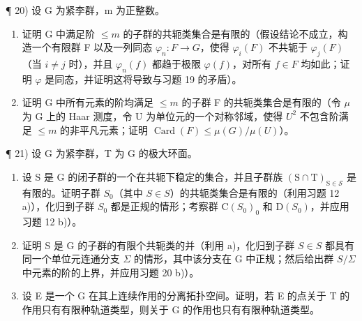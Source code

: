 ¶ 20) 设 G 为紧李群，m 为正整数。

\begin{enumerate}
\def\labelenumi{\alph{enumi})}
\item
  证明 G 中满足阶 \(\leq m\) 的子群的共轭类集合是有限的（假设结论不成立，构造一个有限群 F 以及一列同态 \(\varphi_{n}: F \to G\)，使得 \(\varphi_{i}(F)\) 不共轭于 \(\varphi_{j}(F)\)（当 \(i \neq j\) 时），并且 \(\varphi_{n}(f)\) 都趋于极限 \(\varphi(f)\)，对所有 \(f \in F\) 均如此；证明 \(\varphi\) 是同态，并证明这将导致与习题 19 的矛盾）。
\item
  证明 G 中所有元素的阶均满足 \(\leq m\) 的子群 F 的共轭类集合是有限的（令 \(\mu\) 为 G 上的 Haar 测度，令 U 为单位元的一个对称邻域，使得 \(U^{2}\) 不包含阶满足 \(\leq m\) 的非平凡元素；证明 \(\operatorname{Card}(F) \leq \mu(G)/\mu(U)\)）。
\end{enumerate}

¶ 21) 设 G 为紧李群，T 为 G 的极大环面。

\begin{enumerate}
\def\labelenumi{\alph{enumi})}
\item
  设 S 是 G 的闭子群的一个在共轭下稳定的集合，并且子群族 \((\mathrm{S} \cap \mathrm{T})_{\mathrm{S} \in \mathcal{S}}\) 是有限的。证明子群 \(S_{0}\)（其中 \(S \in S\)）的共轭类集合是有限的（利用习题 12 a)），化归到子群 \(S_{0}\) 都是正规的情形；考察群 \(\mathrm{C}(S_{0})_{0}\) 和 \(\mathrm{D}(S_{0})\)，并应用习题 12 b)）。
\item
  证明 S 是 G 的子群的有限个共轭类的并（利用 a)，化归到子群 \(S \in S\) 都具有同一个单位元连通分支 \(\Sigma\) 的情形，其中该分支在 G 中正规；然后给出群 \(S/\Sigma\) 中元素的阶的上界，并应用习题 20 b)）。
\item
  设 E 是一个 G 在其上连续作用的分离拓扑空间。证明，若 E 的点关于 T 的作用只有有限种轨道类型，则关于 G 的作用也只有有限种轨道类型。
\end{enumerate}

